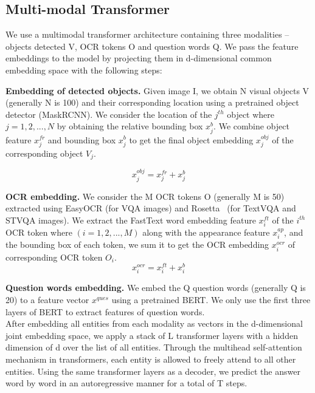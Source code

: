 \documentclass[10pt,twocolumn,letterpaper]{article}
\begin{document}
\subsection{Multi-modal Transformer}
We use a multimodal transformer architecture containing three modalities – objects detected V, OCR tokens O and question words Q. We pass the feature embeddings to the model by projecting them in d-dimensional common embedding space with the following steps: 

\vspace{3pt}
\noindent
\textbf{Embedding of detected objects.} Given image I, we obtain N visual objects V (generally N is 100) and their corresponding location using a pretrained object detector (MaskRCNN). We consider the location of the $j^{th}$ object where $j=1,2,...,N$ by obtaining the relative bounding box $x^{b}_j$. We combine object feature $x^{fr}_j$ and bounding box $x^b_j$ to get the final object embedding $x^{obj}_j$ of the corresponding object $V_j$.

\begin{equation}
    {x^{obj}_j}={x^{fr}_j}+{x^b_j}
\end{equation}

\vspace{3pt}
\noindent
\textbf{OCR embedding.} We consider the M OCR tokens O (generally M is 50) extracted using EasyOCR (for VQA images) and Rosetta~\cite{rosetta} (for TextVQA and STVQA images). We extract the FastText word embedding feature $x^{ft}_i$ of the $i^{th}$ OCR token where $(i=1,2,...,M)$ along with the appearance feature $x^{ap}_i$, and the bounding box of each token, we sum it to get the OCR embedding $x^{ocr}_i$ of corresponding OCR token $O_i$.
\begin{equation}
    {x^{ocr}_i}={x^{ft}_i}+{x^b_i}
\end{equation}

\vspace{3pt}
\noindent
\textbf{Question words embedding.} We embed the Q question words (generally Q is 20) to a feature vector $x^{ques}$ using a pretrained BERT. We only use the first three layers of BERT to extract features of question words. \\ After embedding all entities from each modality as vectors in the d-dimensional joint embedding space, we apply a stack of L transformer layers\cite{attentionis_ayn} with a hidden dimension of d over the list of all entities. Through the multihead self-attention mechanism in transformers, each entity is allowed to freely attend to all other entities. Using the same transformer layers as a decoder, we predict the answer word by word in an autoregressive manner for a total of T steps.
\end{document}
